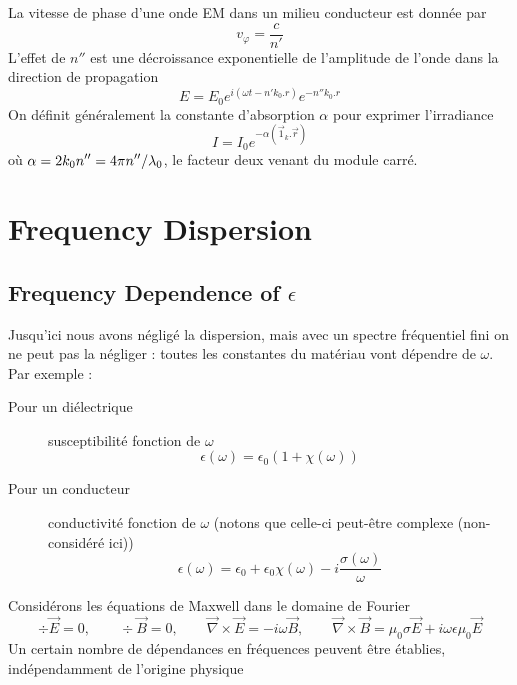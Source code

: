 La vitesse de phase d'une onde EM dans un milieu conducteur est donnée par
\begin{equation}
v_\varphi = \frac{c}{n'}
\end{equation}
L'effet de $n''$ est une décroissance exponentielle de l'amplitude de l'onde dans la direction de 
propagation
\begin{equation}
E = E_0e^{i(\omega t-n'k_0.r)}e^{-n''k_0.r}
\end{equation}
On définit généralement la constante d'absorption $\alpha$ pour exprimer l'irradiance
\begin{equation}
I = I_0e^{-\alpha(\vec{1}_k.\vec{r})}
\end{equation}
où $\displaystyle\alpha = 2k_0n'' = 4\pi n''/\lambda_0$, le facteur deux venant du module carré.

\newpage
\section{Frequency Dispersion}
\subsection{Frequency Dependence of $\epsilon$}
Jusqu'ici nous avons négligé la dispersion, mais avec un spectre fréquentiel fini on ne peut pas la négliger :
toutes les constantes du matériau vont dépendre de $\omega$. Par exemple :
\begin{description}
\item[Pour un diélectrique] susceptibilité fonction de $\omega$
\begin{equation}
\epsilon(\omega) = \epsilon_0(1+\chi(\omega))
\end{equation}
\item[Pour un conducteur] conductivité fonction de $\omega$ (notons que celle-ci peut-être complexe (non-considéré
ici))
\begin{equation}
\epsilon(\omega) = \epsilon_0+\epsilon_0\chi(\omega) -i\dfrac{\sigma(\omega)}{\omega}
\end{equation}
\end{description}
Considérons les équations de Maxwell dans le domaine de Fourier
\begin{equation}
\div \vec E  = 0,\qquad \div\vec{B} = 0, \qquad\vec\nabla\times\vec{E} = -i\omega\vec{B},\qquad
\vec\nabla\times\vec{B}=\mu_0\sigma\vec{E} + i\omega\epsilon\mu_0\vec{E}
\end{equation}
Un certain nombre de dépendances en fréquences peuvent être établies, indépendamment de l'origine physique

